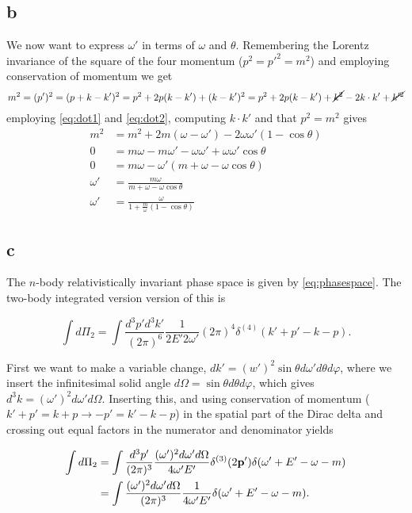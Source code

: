 \documentclass[11pt, a4paper]{amsart}
\begin{document}
\subsection{b}
We now want to express $\omega'$ in terms of $\omega$ and $\theta$. Remembering the Lorentz invariance of the square of the four momentum ($p^2 = p'^2 = m^2$) and employing conservation of momentum we get
\begin{equation}
m^2 = (p')^2 = (p + k - k')^2 = p^2 + 2p(k-k') + (k -k')^2 = p^2 + 2p(k-k') + \cancel{k^2} - 2k\cdot k' + \cancel{k'^2}
\end{equation}
employing \autoref{eq:dot1} and \autoref{eq:dot2}, computing $k\cdot k'$ and that $p^2 = m^2$ gives
\begin{align}
  m^2 &= m^2 + 2m(\omega - \omega') - 2\omega\omega'(1 - \cos \theta) \nonumber \\
       0 &= m\omega -m\omega' - \omega\omega' + \omega\omega'\cos \theta \nonumber \\
       0 &=m\omega - \omega'(m + \omega - \omega\cos\theta) \nonumber \\
       \omega' &= \frac{m\omega}{m + \omega - \omega\cos\theta} \nonumber \\
       \omega' &= \frac{\omega}{1 + \frac{m}{\omega}(1-\cos\theta)} \label{eq:omegaprime}
\end{align}

\subsection{c}
The $n$-body relativistically invariant phase space is given by \autoref{eq:phasespace}. The two-body integrated version version of this is

\begin{equation}
\int d\Pi_2 = \int \frac{d^3p' d^3k'}{(2\pi)^6} \frac{1}{2E'2\omega'} (2\pi)^4 \delta^{(4)}(k' + p' - k - p).
\end{equation}

First we want to make a variable change, $dk' = (w')^2\sin\theta d\omega' d\theta d\varphi$, where we insert the infinitesimal solid angle $d\Omega = \sin\theta d\theta d\varphi$, which gives $d^3k = (\omega')^2 d\omega' d\Omega$. Inserting this, and using conservation of momentum ($k' + p' = k + p \rightarrow -p' = k' - k -p$)  in the spatial part of the Dirac delta and crossing out equal factors in the numerator and denominator yields

\begin{align}
\int d\Pi_2 &= \int \frac{d^3p'}{(2\pi)^3} \frac{(\omega')^2d\omega' d\Omega}{4\omega' E'} \delta^{(3)} (2\vb{p}') \delta (\omega' + E' - \omega -m) \\
		&= \int \frac{(\omega')^2 d\omega' d\Omega}{(2\pi)^3} \frac{1}{4\omega' E'} \delta (\omega' + E' - \omega - m) .
\end{align}
\end{document}
